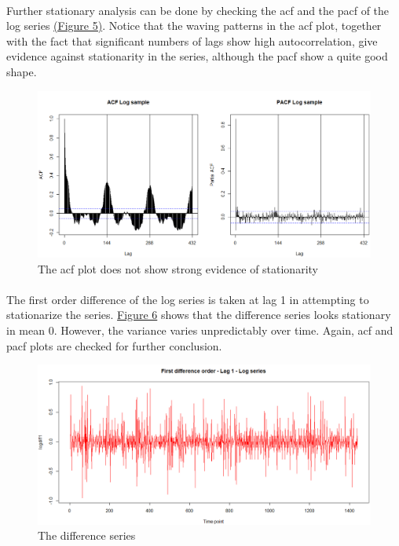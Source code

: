 \documentclass[12pt]{article}
\begin{document}
\paragraph{}
Further stationary analysis can be done by checking the acf and the pacf of the log series \href{figure5}{(Figure 5)}. Notice that the waving patterns in the acf plot, together with the fact that significant numbers of lags show high autocorrelation, give evidence against stationarity in the series, although the pacf show a quite good shape. 
\begin{figure}[H]
  \includegraphics[width=\linewidth]{figure5.png}
  \caption{The acf plot does not show strong evidence of stationarity}
  \label{fig:figure5}
\end{figure}

\paragraph{}
The first order difference of the log series is taken at lag 1 in attempting to stationarize the series. \href{figure6}{Figure 6} shows that the difference series looks stationary in mean 0. However, the variance varies unpredictably over time. Again, acf and pacf plots are checked for further conclusion.
\begin{figure}[H]
  \includegraphics[width=\linewidth]{figure6.png}
  \caption{The difference series}
  \label{fig:figure6}
\end{figure}
\end{document}
